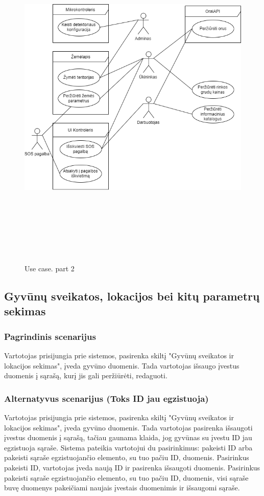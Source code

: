 \documentclass[oneside]{VUMIFPSkursinis}
\begin{document}
\begin{itemize}
\begin{figure}[H]
	\includegraphics[width=15cm,height=17cm,keepaspectratio]{UseCase2.png}
	\caption{Use case. part 2}
	\label{fig:UseCaseFull}
\end{figure}
\end{itemize}

\subsection{Gyvūnų sveikatos, lokacijos bei kitų parametrų sekimas}
\subsubsection{Pagrindinis scenarijus}
	Vartotojas prisijungia prie sistemos, pasirenka skiltį "Gyvūnų sveikatos ir lokacijos sekimas", įveda gyvūno duomenis. Tada vartotojas išsaugo įvestus duomenis į sąrašą, kurį jis gali peržiūrėti, redaguoti.
\subsubsection{Alternatyvus scenarijus (Toks ID jau egzistuoja)}
	Vartotojas prisijungia prie sistemos, pasirenka skiltį "Gyvūnų sveikatos ir lokacijos sekimas", įveda gyvūno duomenis. Tada vartotojas pasirenka išsaugoti įvestus duomenis į sąrašą, tačiau gaunama klaida, jog gyvūnas su įvestu ID jau egzistuoja sąraše. Sistema pateikia vartotojui du pasirinkimus: pakeisti ID arba pakeisti sąraše egzistuojančio elemento, su tuo pačiu ID, duomenis.
	Pasirinkus pakeisti ID, vartotojas įveda naują ID ir pasirenka išsaugoti duomenis. 
	Pasirinkus pakeisti sąraše egzistuojančio elemento, su tuo pačiu ID, duomenis, visi sąraše buvę duomenys pakeičiami naujais įvestais duomenimis ir išsaugomi sąraše.
\end{document}
